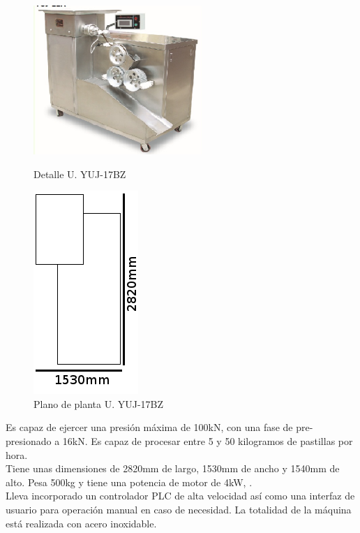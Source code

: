 	\begin{figure}[htp]
		\begin{minipage}{.48\textwidth}
			\centering
			\includegraphics[scale=1]{Datasheets/2MaquinaPrensadoFoto.png}
			\caption{Detalle U. YUJ-17BZ}
			\label{fig:testa}
		\end{minipage}
		\begin{minipage}{.48\textwidth}
			\centering
			\includegraphics[scale=0.8]{Datasheets/Miniaturas/compresion.png}
			\caption{Plano de planta U. YUJ-17BZ}
			\label{fig:testb}
		\end{minipage}
	\end{figure}
		

	Es capaz de ejercer una presión máxima de 100kN, con una fase de pre-presionado a 16kN. Es capaz de procesar entre 5 y 50 kilogramos de pastillas por hora. \\

	Tiene unas dimensiones de 2820mm de largo, 1530mm de ancho y 1540mm de alto. Pesa 500kg y tiene una potencia de motor de 4kW, .\\

	Lleva incorporado un controlador PLC de alta velocidad así como una interfaz de usuario para operación manual en caso de necesidad. La totalidad de la máquina está realizada con acero inoxidable. 


